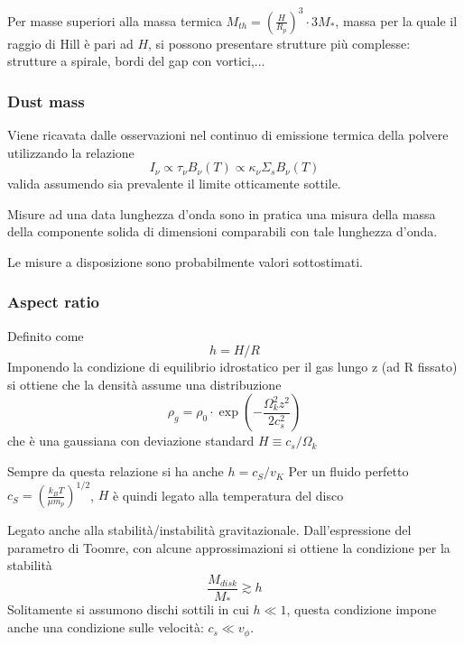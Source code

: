 \documentclass[DIN, pagenumber=false, fontsize=11pt, parskip=half]{scrartcl}
\begin{document}
Per masse superiori alla massa termica $M_{th} = \left(\frac {H}{ R_p} \right)^3\cdot 3M_*$, massa per la quale il raggio di Hill è pari ad $H$, si possono presentare strutture più complesse: strutture a spirale, bordi del gap con vortici,...

\subsubsection{Dust mass}
\label{dustmass}
Viene ricavata dalle osservazioni nel continuo di emissione termica della polvere utilizzando la relazione
\begin{equation}
 I_\nu \propto \tau_\nu B_\nu(T) \propto \kappa_\nu \Sigma_s B_\nu(T)
\end{equation}
valida assumendo sia prevalente il limite otticamente sottile.

Misure ad una data lunghezza d'onda sono in pratica una misura della massa della componente solida di dimensioni comparabili con tale lunghezza d'onda.

Le misure a disposizione sono probabilmente valori sottostimati.

\subsubsection{Aspect ratio}
\label{aspectratio}
Definito come
\begin{equation}
h =H/R
\end{equation}
Imponendo la condizione di equilibrio idrostatico per il gas lungo z (ad R fissato) si ottiene che la densità assume una distribuzione
\begin{equation}
\rho_g = \rho_0 \cdot \exp(-\frac{\Omega_k^2z^2}{2c_s^2})
\end{equation}
che è una gaussiana con deviazione standard $H \equiv c_s/\Omega_k$

Sempre da questa relazione si ha anche $h = c_S/v_K$
Per un fluido perfetto $c_S=(\frac{k_BT}{\mu m_p})^{1/2}$, $H$ è quindi legato alla temperatura del disco

Legato anche alla stabilità/instabilità gravitazionale. Dall'espressione del parametro di Toomre, con alcune approssimazioni si ottiene la condizione per la stabilità
\begin{equation}
\frac{M_{disk}}{M_*} \gtrsim h
\end{equation}
Solitamente si assumono dischi sottili in cui $h \ll 1$, questa condizione impone anche una condizione sulle velocità: $c_s \ll v_\phi$.
\end{document}
